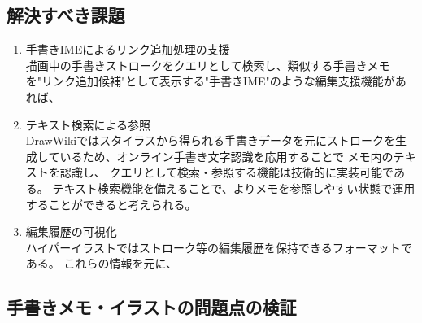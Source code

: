 \subsection{解決すべき課題}
\begin{enumerate}
    \item 手書きIMEによるリンク追加処理の支援\\
    描画中の手書きストロークをクエリとして検索し、類似する手書きメモを"リンク追加候補"として表示する"手書きIME"のような編集支援機能があれば、
    \item テキスト検索による参照\\
    DrawWikiではスタイラスから得られる手書きデータを元にストロークを生成しているため、オンライン手書き文字認識を応用することで
    メモ内のテキストを認識し、 クエリとして検索・参照する機能は技術的に実装可能である。
    テキスト検索機能を備えることで、よりメモを参照しやすい状態で運用することができると考えられる。
    \item 編集履歴の可視化\\
    ハイパーイラストではストローク等の編集履歴を保持できるフォーマットである。
    これらの情報を元に、
\end{enumerate}

\subsection{手書きメモ・イラストの問題点の検証}

